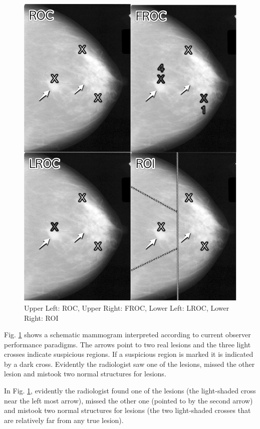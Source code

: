 \documentclass[
]{book}
\begin{document}
\begin{figure}
\includegraphics[width=1\linewidth]{images/4Paradigms} \caption{Upper Left: ROC, Upper Right: FROC, Lower Left: LROC, Lower Right: ROI}\label{fig:froc-paradigm-4}
\end{figure}

Fig. \ref{fig:froc-paradigm-4} shows a schematic mammogram interpreted according to current observer performance paradigms. The arrows point to two real lesions and the three light crosses indicate suspicious regions. If a suspicious region is marked it is indicated by a dark cross. Evidently the radiologist saw one of the lesions, missed the other lesion and mistook two normal structures for lesions.

In Fig. \ref{fig:froc-paradigm-4}, evidently the radiologist found one of the lesions (the light-shaded cross near the left most arrow), missed the other one (pointed to by the second arrow) and mistook two normal structures for lesions (the two light-shaded crosses that are relatively far from any true lesion).
\end{document}

